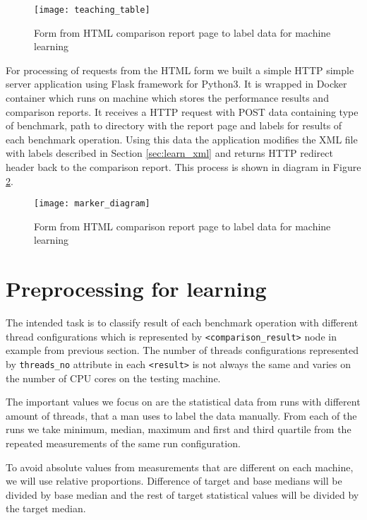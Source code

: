 \begin{figure}
  \centering
  \texttt{[image: teaching\_table]}
  \caption{Form from HTML comparison report page to label data for machine learning}
  \label{fig:label_form}
\end{figure}

For processing of requests from the HTML form we built a simple HTTP simple
server application using Flask framework for Python3. It is wrapped in Docker
container which runs on machine which stores the performance results and
comparison reports. It receives a HTTP request with POST data containing type of
benchmark, path to directory with the report page and labels for results of each
benchmark operation. Using this data the application modifies the XML file with
labels described in Section \ref{sec:learn_xml} and returns HTTP redirect header
back to the comparison report. This process is shown in diagram in Figure
\ref{fig:marker_diagram}.

\begin{figure}
  \centering
  \texttt{[image: marker\_diagram]}
  \caption{Form from HTML comparison report page to label data for machine learning}
  \label{fig:marker_diagram}
\end{figure}

\section{Preprocessing for learning} \label{sec:learn_preprocess}
The intended task is to classify result of each benchmark operation with
different thread configurations which is represented by
\texttt{<comparison\_result>} node in example from previous section. The number
of threads configurations represented by \texttt{threads\_no} attribute in each
\texttt{<result>} is not always the same and varies on the number of CPU cores
on the testing machine.

The important values we focus on are the statistical data from runs with
different amount of threads, that a man uses to label the data manually. From
each of the runs we take minimum, median, maximum and first and third quartile
from the repeated measurements of the same run configuration.

To avoid absolute values from measurements that are different on each machine,
we will use relative proportions. Difference of target and base medians will be
divided by base median and the rest of target statistical values will be divided
by the target median.

